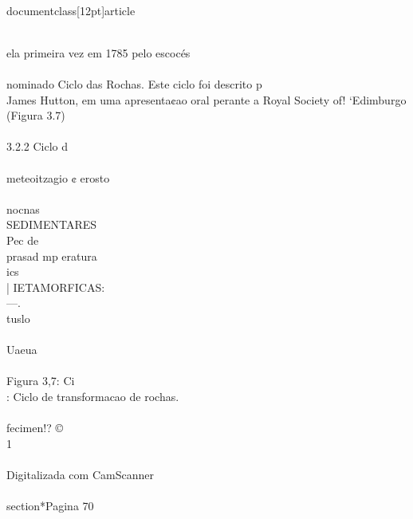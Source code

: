 \\documentclass[12pt]{article}
\begin{document}
\\
ela primeira vez em 1785 pelo escocés\\
\\
nominado Ciclo das Rochas. Este ciclo foi descrito p\\
James Hutton, em uma apresenta¢ao oral perante a Royal Society of! ‘Edimburgo (Figura 3.7)\\
\\
3.2.2 Ciclo d\\
\\
meteoitzagio ¢ erosto\\
\\
nocnas\\
SEDIMENTARES\\
Pec de\\
prasad mp eratura\\
ics\\
| IETAMORFICAS:\\
—.\\
tuslo\\
\\
Uaeua\\
\\
Figura 3,7: Ci\\
: Ciclo de transformacao de rochas.\\
\\
fecimen!? ©\\
1\\
\\
Digitalizada com CamScanner\\

\\section*{Pagina 70}
\end{document}
